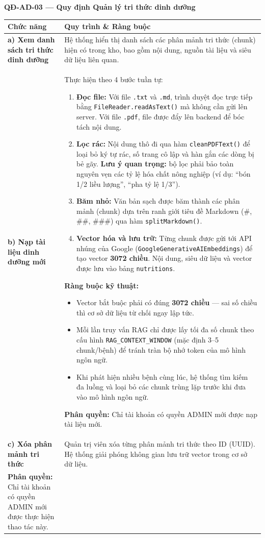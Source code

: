 \documentclass[12pt,a4paper]{article}
\begin{document}
\vspace{0.3cm}
\noindent\textbf{QĐ-AD-03 --- Quy định Quản lý tri thức dinh dưỡng}
 
\begin{longtable}{|
    >{\raggedright\arraybackslash}p{2.8cm}|
    >{\raggedright\arraybackslash}p{12cm}|}
\hline
\rowcolor{headerblue}
\textbf{Chức năng} & \textbf{Quy trình \& Ràng buộc} \\
\hline
\endhead
\textbf{a) Xem danh sách tri thức dinh dưỡng} &
Hệ thống hiển thị danh sách các phân mảnh tri thức (chunk) hiện có trong kho, bao gồm nội dung, nguồn tài liệu và siêu dữ liệu liên quan. \\
\hline
\textbf{b) Nạp tài liệu dinh dưỡng mới} &
Thực hiện theo 4 bước tuần tự:
\begin{enumerate}[leftmargin=*,topsep=2pt,itemsep=1pt]
    \item \textbf{Đọc file:} Với file \texttt{.txt} và \texttt{.md}, trình duyệt đọc trực tiếp bằng \texttt{FileReader.readAsText()} mà không cần gửi lên server. Với file \texttt{.pdf}, file được đẩy lên backend để bóc tách nội dung.
    \item \textbf{Lọc rác:} Nội dung thô đi qua hàm \texttt{cleanPDFText()} để loại bỏ ký tự rác, số trang cô lập và hàn gắn các dòng bị bẻ gãy. \textbf{Lưu ý quan trọng:} bộ lọc phải bảo toàn nguyên vẹn các tỷ lệ hóa chất nông nghiệp (ví dụ: ``bón 1/2 liều lượng'', ``pha tỷ lệ 1/3'').
    \item \textbf{Băm nhỏ:} Văn bản sạch được băm thành các phân mảnh (chunk) dựa trên ranh giới tiêu đề Markdown (\#, \#\#, \#\#\#) qua hàm \texttt{splitMarkdown()}.
    \item \textbf{Vector hóa và lưu trữ:} Từng chunk được gửi tới API nhúng của Google (\texttt{GoogleGenerativeAIEmbeddings}) để tạo vector \textbf{3072 chiều}. Nội dung, siêu dữ liệu và vector được lưu vào bảng \texttt{nutritions}.
\end{enumerate}
\textbf{Ràng buộc kỹ thuật:}
\begin{itemize}[leftmargin=*,topsep=2pt,itemsep=1pt]
    \item Vector bắt buộc phải có đúng \textbf{3072 chiều} --- sai số chiều thì cơ sở dữ liệu từ chối ngay lập tức.
    \item Mỗi lần truy vấn RAG chỉ được lấy tối đa số chunk theo cấu hình \texttt{RAG\_CONTEXT\_WINDOW} (mặc định 3--5 chunk/bệnh) để tránh tràn bộ nhớ token của mô hình ngôn ngữ.
    \item Khi phát hiện nhiều bệnh cùng lúc, hệ thống tìm kiếm đa luồng và loại bỏ các chunk trùng lặp trước khi đưa vào mô hình ngôn ngữ.
\end{itemize}
\textbf{Phân quyền:} Chỉ tài khoản có quyền ADMIN mới được nạp tài liệu mới. \\
\hline
\textbf{c) Xóa phân mảnh tri thức} &
Quản trị viên xóa từng phân mảnh tri thức theo ID (UUID). Hệ thống giải phóng không gian lưu trữ vector trong cơ sở dữ liệu. \\
\textbf{Phân quyền:} Chỉ tài khoản có quyền ADMIN mới được thực hiện thao tác này. \\
\hline
\end{longtable}
 
\end{document}
